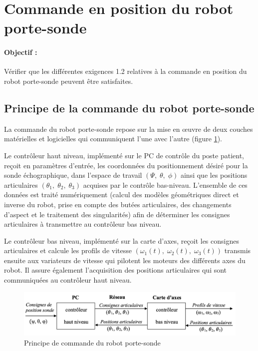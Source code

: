 \section{Commande en position du robot porte-sonde}

\paragraph{Objectif :} Vérifier que les différentes exigences 1.2 relatives à la commande en position du robot porte-sonde peuvent être satisfaites. 

\subsection{Principe de la commande du robot porte-sonde}

La commande du robot porte-sonde repose sur la mise en \oe uvre de deux couches matérielles et logicielles qui communiquent l'une avec l'autre (figure \ref{fig12}). 

Le contrôleur haut niveau, implémenté sur le PC de contrôle du poste patient, reçoit en paramètres d'entrée, les coordonnées du positionnement désiré pour la sonde échographique, dans l'espace de travail $(\Psi,\;\theta,\;\phi)$ ainsi que les positions articulaires $(\theta_1,\;\theta_2,\;\theta_3)$ acquises par le contrôle bas-niveau. L'ensemble de ces données est traité numériquement (calcul des modèles géométriques direct et inverse du robot, prise en compte des butées articulaires, des changements d'aspect et le traitement des singularités) afin de déterminer les consignes articulaires à transmettre au contrôleur bas niveau. 

Le contrôleur bas niveau, implémenté sur la carte d'axes, reçoit les consignes articulaires et calcule les profils de vitesse $(\omega_1(t),\;\omega_2(t),\;\omega_3(t))$ transmis ensuite aux variateurs de vitesse qui pilotent les moteurs des différents axes du robot. Il assure également l'acquisition des positions articulaires qui sont communiquées au contrôleur haut niveau. 

\begin{figure}[ht!]
\begin{center}
 \includegraphics[width=0.9\linewidth]{img/fig12}
\end{center}
\caption{Principe de commande du robot porte-sonde}
\label{fig12}
\end{figure}

